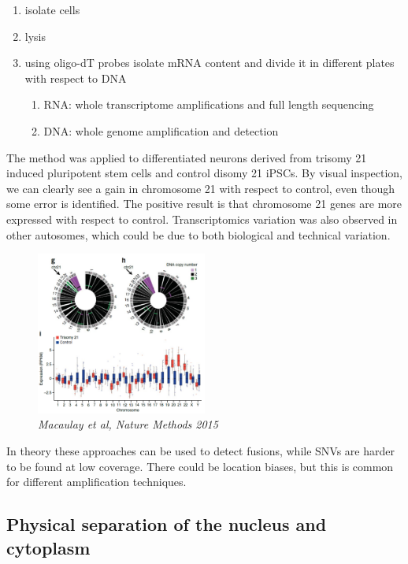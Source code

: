 \begin{enumerate}
\def\labelenumi{\arabic{enumi}.}
\tightlist
\item
  isolate cells
\item
  lysis
\item
  using oligo-dT probes isolate mRNA content and divide it in different
  plates with respect to DNA

  \begin{enumerate}
  \def\labelenumii{\arabic{enumii}.}
  \tightlist
  \item
    RNA: whole transcriptome amplifications and full length sequencing
  \item
    DNA: whole genome amplification and detection
  \end{enumerate}
\end{enumerate}

The method was applied to differentiated neurons derived from trisomy 21
induced pluripotent stem cells and control disomy 21 iPSCs. By visual
inspection, we can clearly see a gain in chromosome 21 with respect to
control, even though some error is identified. The positive
result is that chromosome 21 genes are more expressed with respect to
control. Transcriptomics variation was also observed in other autosomes,
which could be due to both biological and technical variation.

\begin{figure}
\centering
\includegraphics[width=0.5\textwidth]{images/Screenshot_3.png}
\caption{\emph{Macaulay et al, Nature Methods 2015}}
\end{figure}


In theory these approaches can be used to detect fusions, while SNVs are
harder to be found at low coverage. There could be location biases, but
this is common for different amplification techniques.

\hypertarget{physical-separation-of-the-nucleus-and-cytoplasm}{%
\subsection{Physical separation of the nucleus and
cytoplasm}\label{physical-separation-of-the-nucleus-and-cytoplasm}}

